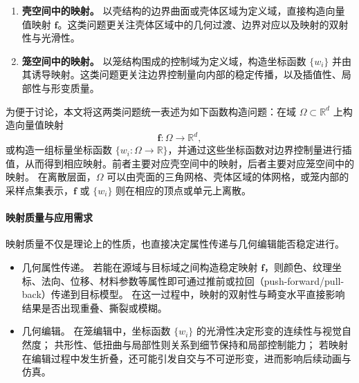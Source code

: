\begin{enumerate}
  \item \textbf{壳空间中的映射。} 以壳结构的边界曲面或壳体区域为定义域，直接构造向量值映射 $\mathbf{f}$。这类问题更关注壳体区域中的几何过渡、边界对应以及映射的双射性与光滑性。
  \item \textbf{笼空间中的映射。} 以笼结构围成的控制域为定义域，构造坐标函数 $\{w_i\}$ 并由其诱导映射。这类问题更关注边界控制量向内部的稳定传播，以及插值性、局部性与形变质量。
\end{enumerate}

为便于讨论，本文将这两类问题统一表述为如下函数构造问题：在域 $\Omega \subset \mathbb{R}^d$ 上构造向量值映射
\begin{equation}
  \mathbf{f}: \Omega \rightarrow \mathbb{R}^d,
\end{equation}
或构造一组标量坐标函数 $\{w_i:\Omega\rightarrow\mathbb{R}\}$，并通过这些坐标函数对边界控制量进行插值，从而得到相应映射。前者主要对应壳空间中的映射，后者主要对应笼空间中的映射。
在离散层面，$\Omega$ 可以由壳面的三角网格、壳体区域的体网格，或笼内部的采样点集表示，$\mathbf{f}$ 或 $\{w_i\}$ 则在相应的顶点或单元上离散。
\paragraph{映射质量与应用需求}

映射质量不仅是理论上的性质，也直接决定属性传递与几何编辑能否稳定进行。

\begin{itemize}
  \item 几何属性传递。
  若能在源域与目标域之间构造稳定映射 $\mathbf{f}$，则颜色、纹理坐标、法向、位移、材料参数等属性即可通过推前或拉回（push-forward/pull-back）传递到目标模型。
  在这一过程中，映射的双射性与畸变水平直接影响结果是否出现重叠、撕裂或模糊。
  \item 几何编辑。
  在笼编辑中，坐标函数 $\{w_i\}$ 的光滑性决定形变的连续性与视觉自然度；
  共形性、低扭曲与局部性则关系到细节保持和局部控制能力；
  若映射在编辑过程中发生折叠，还可能引发自交与不可逆形变，进而影响后续动画与仿真。
\end{itemize}

